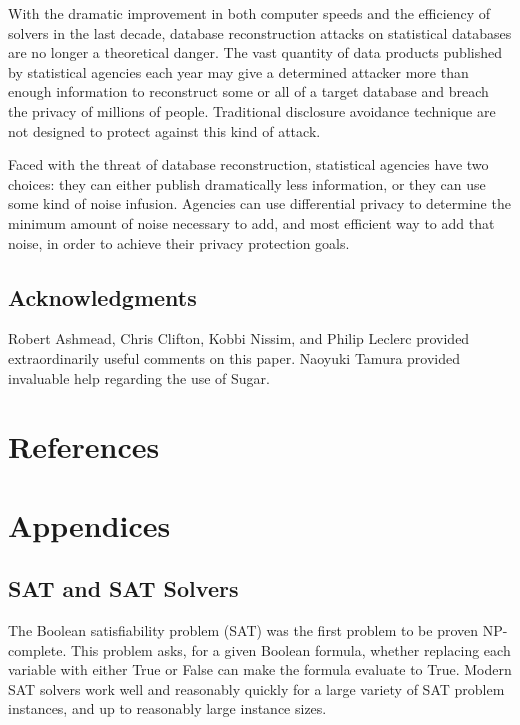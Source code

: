 \documentclass[runningheads]{llncs}
\begin{document}
With the dramatic improvement in both computer speeds and the
efficiency of solvers in the last decade, database reconstruction
attacks on statistical databases are no longer a theoretical
danger. The vast quantity of data products published by statistical
agencies each year may give a determined attacker more than enough
information to reconstruct some or all of a target database and breach
the privacy of millions of people. Traditional disclosure avoidance
technique are not designed to protect against this kind of attack.

Faced with the threat of database reconstruction, statistical agencies
have two choices: they can either publish dramatically less
information, or they can use some kind of noise infusion.  Agencies
can use differential privacy to determine the minimum
amount of noise necessary to add, and most efficient way to add that
noise, in order to achieve their privacy protection goals.

\subsection{Acknowledgments}
Robert Ashmead, Chris Clifton, Kobbi Nissim, and Philip Leclerc
provided extraordinarily useful
comments on this paper. Naoyuki Tamura provided invaluable help
regarding the use of Sugar.

\section{References}




\section{Appendices}

\subsection{SAT and SAT Solvers}

The Boolean satisfiability problem (SAT) was the first
problem to be proven NP-complete\cite{cooklevin}. This problem asks,
for a given Boolean formula, whether replacing each variable with
either True or False can make the formula evaluate to True.  Modern SAT
solvers work well and reasonably quickly for a large variety of SAT
problem instances, and up to reasonably large instance sizes. 
\end{document}
